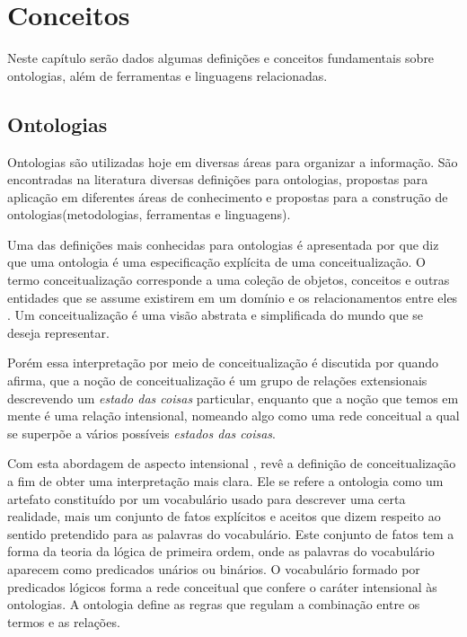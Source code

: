 \chapter{Conceitos}
\label{cap:conceitos}

Neste capítulo serão dados algumas definições e conceitos fundamentais sobre 
ontologias, além de ferramentas e linguagens relacionadas.

\section{Ontologias}
\label{sec:definicao}

Ontologias são utilizadas hoje em diversas áreas para organizar a informação. 
São encontradas na literatura diversas definições para ontologias, propostas 
para aplicação em diferentes áreas de conhecimento e propostas para a construção 
de ontologias(metodologias, ferramentas e linguagens).

Uma das definições mais conhecidas para ontologias é apresentada por 
\cite{gruber1995toward} que diz que uma ontologia é uma especificação explícita 
de uma conceitualização. O termo conceitualização corresponde a uma coleção de 
objetos, conceitos e outras entidades que se assume existirem em um domínio e 
os relacionamentos entre eles \cite{genesereth1987logical}. Um conceitualização 
é uma visão abstrata e simplificada do mundo que se deseja representar.

Porém essa interpretação por meio de conceitualização é discutida por 
\cite{giaretta1995ontologies} quando afirma, que a noção de conceitualização é um 
grupo de relações extensionais descrevendo um {\it estado das coisas} particular, 
enquanto que a noção que temos em mente é uma relação intensional, nomeando algo 
como uma rede conceitual a qual se superpõe a vários possíveis 
{\it estados das coisas}.

Com esta abordagem de aspecto intensional \cite{guarino1998formal}, revê a 
definição de conceitualização a fim de obter uma interpretação mais clara. Ele 
se refere a ontologia como um artefato constituído por um vocabulário usado para 
descrever uma certa realidade, mais um conjunto de fatos explícitos e aceitos 
que dizem respeito ao sentido pretendido para as palavras do vocabulário. Este 
conjunto de fatos tem a forma da teoria da lógica de primeira ordem, onde as 
palavras do vocabulário aparecem como predicados unários ou binários. O 
vocabulário formado por predicados lógicos forma a rede conceitual que confere 
o caráter intensional às ontologias. A ontologia define as regras que regulam a 
combinação entre os termos e as relações.

